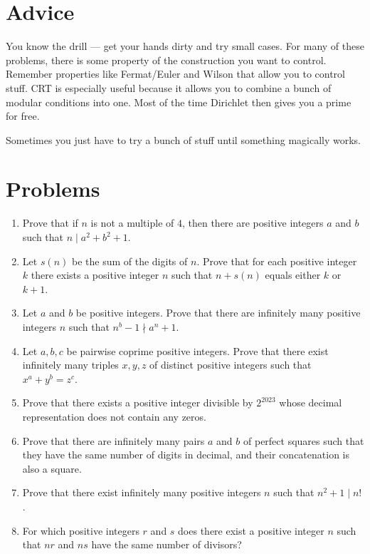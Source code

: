 \documentclass{article}
\begin{document}
\section{Advice}
You know the drill --- get your hands dirty and try small cases. For many of
these problems, there is some property of the construction you want to control.
Remember properties like Fermat/Euler and Wilson that allow you to control stuff.
CRT is especially useful because it allows
you to combine a bunch of modular conditions into one. Most of the time
Dirichlet then gives you a prime for free.

Sometimes you just have to try a bunch of stuff until something magically works.
\section{Problems}
\begin{enumerate}
  \item Prove that if $n$ is not a multiple of $4$, then there are positive
    integers $a$ and $b$ such that $n\mid a^2+b^2+1$.
  \item Let $s(n)$ be the sum of the digits of $n$. Prove that for each positive
    integer $k$ there exists a positive integer $n$ such that $n+s(n)$ equals
    either $k$ or $k+1$.
  \item Let $a$ and $b$ be positive integers. Prove that there are infinitely
    many positive integers $n$ such that $n^b-1\nmid a^n+1$.
  \item Let $a,b,c$ be pairwise coprime positive integers. Prove that there
    exist infinitely many triples $x,y,z$ of distinct positive integers such
    that $x^a+y^b=z^c$.
  \item Prove that there exists a positive integer divisible by $2^{2023}$ whose
    decimal representation does not contain any zeros.
  \item Prove that there are infinitely many pairs $a$ and $b$ of perfect
    squares such that they have the same number of digits in decimal, and their
    concatenation is also a square.
  \item Prove that there exist infinitely many positive integers $n$ such that
    $n^2+1\mid n!$.
  \item For which positive integers $r$ and $s$ does there exist a positive
    integer $n$ such that $nr$ and $ns$ have the same number of divisors?
\end{enumerate}
\newpage
\end{document}
